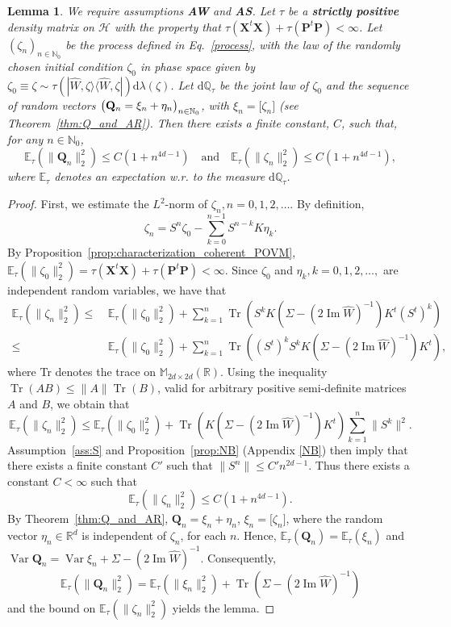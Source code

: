 \documentclass[11pt]{article}
\newtheorem{lemma}[theorem]{Lemma}
\newcommand{\Tr}{\operatorname{Tr}}
\newcommand{\ket}[1]{|{#1}\rangle}
\newcommand{\bra}[1]{\langle{#1}|}
\renewcommand{\Im}{\operatorname{Im}}
\renewcommand{\d}{{\mathrm d}}
\begin{document}
\begin{lemma}\label{lem:poly_bound_var}
We require assumptions {\bf{AW}} and {\bf{AS}}. Let $\tau$ be a {\bf{strictly positive}} density matrix on $\mathcal{H}$ with the property that \mbox{$\tau(\mathbf X^t\mathbf X)+\tau(\mathbf P^t\mathbf P)<\infty$.} Let $(\zeta_n)_{n\in\mathbb N_0}$ be the 
process defined in Eq.~\eqref{process}, with the law of the randomly chosen initial condition $\zeta_0$ 
in phase space given by 
$\zeta_0 \equiv \zeta \sim \tau(\ket{\widehat W,\zeta}\bra{\widehat W,\zeta})\d\lambda(\zeta)$. Let $\d \mathbb Q_\tau$ 
be the joint law of $\zeta_0$ and the sequence of random vectors $\big({\bf{Q}}_{n} = \xi_n+ \eta_n \big)_{n\in \mathbb N_0}$, 
with $\xi_n=\big[\zeta_n\big]$  (see Theorem~\ref{thm:Q_and_AR}). Then there exists a finite constant, $C$, such that, 
for any $n\in \mathbb N_0$,
	$$\mathbb E_\tau(\|\mathbf Q_n\|_2^2)\leq C(1+n^{4d-1})\quad \mbox{and} \quad \mathbb E_\tau(\|\zeta_n\|_2^2)\leq C(1+n^{4d-1}),$$
	where $\mathbb{E}_{\tau}$ denotes an expectation w.r. to the measure $\d \mathbb Q_\tau$.
\end{lemma}
\begin{proof}
	First, we estimate the $L^2$-norm of $\zeta_n, n=0,1,2,\dots$. By definition,
	$$\zeta_n= S^n\zeta_0-\sum_{k=0}^{n-1}S^{n-k}K\eta_k.$$
	By Proposition~\ref{prop:characterization_coherent_POVM}, 
	$\mathbb E_{\tau}(\|\zeta_0\|_2^2)=\tau(\mathbf X^t\mathbf X)+\tau(\mathbf P^t\mathbf P)<\infty$. Since $\zeta_0$ and 
	$\eta_k, k=0,1,2,\dots,$ are independent random variables, we have that
	\begin{align*}
	\mathbb E_{\tau} (\|\zeta_n\|_2^2)\leq\ &\mathbb E_{\tau}(\|\zeta_0\|_2^2)+\sum_{k=1}^{n}\Tr(S^{k}K(\Sigma- (2 \Im \widehat{W})^{-1}) K^t(S^t)^k)\\
	\leq\ &\mathbb E_{\tau}(\|\zeta_0\|_2^2)+\sum_{k=1}^{n}\Tr((S^t)^kS^{k}K(\Sigma- (2 \Im \widehat{W})^{-1}) K^t),
	\end{align*}
		where Tr denotes the trace on $\mathbb{M}_{2d\times 2d}(\mathbb{R})$.
	Using the inequality $\Tr(AB)\leq \|A\|\Tr(B)$, valid for arbitrary positive semi-definite matrices $A$ and $B$, we obtain that
	$$\mathbb E_{\tau} (\|\zeta_n\|_2^2)\leq\mathbb E_{\tau}(\|\zeta_0\|_2^2)+\Tr(K(\Sigma- (2 \Im \widehat{W})^{-1}) K^t)\sum_{k=1}^{n}\|S^k\|^{2}.$$
	Assumption~\ref{ass:S} and Proposition~\ref{prop:NB} (Appendix \ref{NB}) then imply that there exists a finite 
	constant $C'$ such that $\|S^n\|\leq C' n^{2d-1}$. Thus there exists a constant $C<\infty$ such that
	$$\mathbb E_{\tau} (\|\zeta_n\|_2^2)\leq C(1+n^{4d-1}).$$
	By Theorem~\ref{thm:Q_and_AR}, $\mathbf Q_n=\xi_n+\eta_n$, $\xi_n =\big[\zeta_n \big]$, where the random vector 
	$\eta_n \in \mathbb{R}^{d}$ is independent of $\zeta_n$, for each $n$. Hence, 
	$\mathbb E_{\tau}(\mathbf Q_n)=\mathbb E_{\tau}(\xi_n)$ and  
	$\operatorname{Var}\mathbf Q_n=\operatorname{Var}\xi_n +\Sigma-(2\Im\widehat W)^{-1}$. Consequently,
	$$\mathbb E_{\tau}(\|\mathbf Q_n\|_2^2)=\mathbb E_{\tau}(\|\xi_n\|_2^2)+\Tr(\Sigma-(2\Im \widehat W)^{-1})$$
	and the bound on $\mathbb E_{\tau}(\|\zeta_n\|_2^2)$ yields the lemma.
\end{proof}
\end{document}
